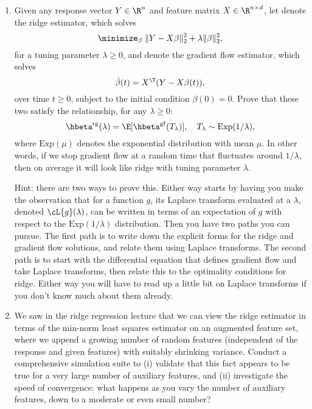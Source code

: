 \documentclass{article}
\begin{document}
\begin{enumerate}[label=(\alph*)]
\item Given any response vector $Y \in \R^n$ and feature matrix $X \in \R^{n
    \times d}$, let  denote the ridge
  estimator, which solves  
  \[
  \minimize_\beta \; \|Y - X\beta\|_2^2 + \lambda \|\beta\|_2^2,
  \]
  for a tuning parameter $\lambda \geq 0$, and 
  denote the gradient flow estimator, which solves 
  \[
  \dot\beta(t) = X^\T (Y - X\beta(t)),
  \]
  over time $t \geq 0$, subject to the initial condition $\beta(0)=0$. Prove
  that these two satisfy the relationship, for any $\lambda \geq 0$:
  \[
  \hbeta^{\mathrm{rg}}(\lambda) = \E[ \hbeta^{\mathrm{gf}}(T_\lambda) ], \quad 
  \text{$T_\lambda \sim \mathrm{Exp}(1/\lambda)$},
  \]
  where $\mathrm{Exp}(\mu)$ denotes the exponential distribution with mean
  $\mu$. In other words, if we stop gradient flow at a random time that
  fluctuates around $1/\lambda$, then on average it will look like ridge with 
  tuning parameter $\lambda$.

  Hint: there are two ways to prove this. Either way starts by having you make
  the observation that for a function $g$, its Laplace transform evaluated at a
  $\lambda$, denoted $\cL\{g\}(\lambda)$, can be written in terms of an
  expectation of $g$ with respect to the $\mathrm{Exp}(1/\lambda)$ distribution.
  Then you have two paths you can pursue. The first path is to write down the 
  explicit forms for the ridge and gradient flow solutions, and relate them
  using Laplace transforms. The second path is to start with the differential
  equation that defines gradient flow and take Laplace transforms, then relate
  this to the optimality conditions for ridge. Either way you will have to read
  up a little bit on Laplace transforms if you don't know much about them
  already. 

\item We saw in the ridge regression lecture that we can view the ridge
  estimator in terms of the min-norm least squares estimator on an augmented
  feature set, where we append a growing number of random features (independent
  of the response and given features) with suitably shrinking variance. Conduct
  a comprehensive simulation suite to (i) validate that this fact appears to be
  true for a very large number of auxiliary features, and (ii) investigate the
  speed of convergence: what happens as you vary the number of auxiliary
  features, down to a moderate or even small number? 


\end{enumerate}
\end{document}
